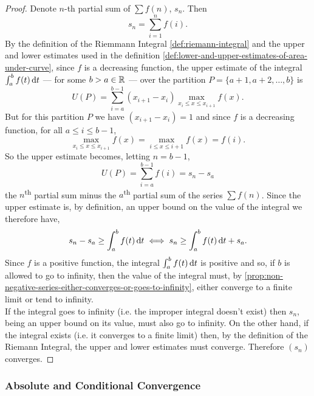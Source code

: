 \documentclass[../MathsNotesBase.tex]{subfiles}
\begin{document}
{		\bigskip
		\labeledTheorem{\textbf{(Integral Test)} Let ${ a \geq 1 \in \R{} }$ and ${ f: \R{} \longmapsto \R{} }$ be a positive, decreasing, integrable function on ${ [a, \infty) }$. Then the series ${ \sum f(n) }$ converges iff the improper integral ${ \int_a^\infty f(t) \dif t }$ exists.}{series-integral-test}
		\begin{proof}
			Denote $n$-th partial sum of ${ \sum f(n) }$, $s_n$. Then
			\[ s_n = \sum_{i=1}^n f(i). \]
			By the definition of the Riemmann Integral \ref{def:riemann-integral} and the upper and lower estimates used in the definition \ref{def:lower-and-upper-estimates-of-area-under-curve}, since $f$ is a decreasing function, the upper estimate of the integral ${ \int_a^b f(t) \dif t }$ --- for some ${ b > a \in \mathbb{R}^{} }$ --- over the partition ${ P = \{ a+1, a+2,\dots, b\} }$ is
			\[ U(P) = \sum_{i=a}^{b-1} (x_{i+1} - x_i) \max_{ x_i \leq x \leq x_{i+1} }{ f(x) }. \]
			But for this partition $P$ we have ${ (x_{i+1} - x_i) = 1 }$ and since $f$ is a decreasing function, for all ${ a \leq i \leq b-1 }$,
			\[ \max_{ x_i \leq x \leq x_{i+1} }{ f(x) } = \max_{ i \leq x \leq i+1 }{ f(x) } = f(i). \]
			So the upper estimate becomes, letting ${ n = b-1 }$,
			\[ U(P) = \sum_{i=a}^{b-1} f(i) = s_n - s_a \]
			the $n$\textsuperscript{th} partial sum minus the $a$\textsuperscript{th} partial sum of the series ${ \sum f(n) }$. Since the upper estimate is, by definition, an upper bound on the value of the integral we therefore have,
			\[ s_n - s_a \geq \int_a^b f(t) \dif t \iff s_n \geq \int_a^b f(t) \dif t + s_a. \]
			Since $f$ is a positive function, the integral ${ \int_a^b f(t) \dif t }$ is positive and so, if $b$ is allowed to go to infinity, then the value of the integral must, by \autoref{prop:non-negative-series-either-converges-or-goes-to-infinity}, either converge to a finite limit or tend to infinity.\\
			If the integral goes to infinity (i.e. the improper integral doesn't exist) then $s_n$, being an upper bound on its value, must also go to infinity. On the other hand, if the integral exists (i.e. it converges to a finite limit) then, by the definition of the Riemann Integral, the upper and lower estimates must converge. Therefore $(s_n)$ converges.
		\end{proof}
	
	
		\biggerskip
		\subsubsection{Absolute and Conditional Convergence}
		\bigskip
		}
\end{document}
